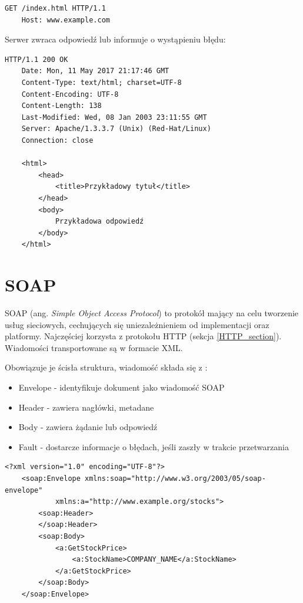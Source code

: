 \begin{lstlisting}[caption={Przykład żądania HTTP},captionpos=b]
    GET /index.html HTTP/1.1
    Host: www.example.com
\end{lstlisting}

Serwer zwraca odpowiedź lub informuje o wystąpieniu błędu:

\begin{lstlisting}[caption={Przykład odpowiedzi serwera ze statusem 200 OK},captionpos=b]
    HTTP/1.1 200 OK
    Date: Mon, 11 May 2017 21:17:46 GMT
    Content-Type: text/html; charset=UTF-8
    Content-Encoding: UTF-8
    Content-Length: 138
    Last-Modified: Wed, 08 Jan 2003 23:11:55 GMT
    Server: Apache/1.3.3.7 (Unix) (Red-Hat/Linux)
    Connection: close

    <html>
        <head>
            <title>Przykładowy tytuł</title>
        </head>
        <body>
            Przykładowa odpowiedź
        </body>
    </html>
\end{lstlisting}


\section{SOAP}

SOAP (ang. \textit{Simple Object Access Protocol}) to protokół mający na celu tworzenie usług sieciowych, cechujących się uniezależnieniem od implementacji oraz platformy. Najczęściej korzysta z protokołu HTTP (sekcja \ref{HTTP_section}). Wiadomości transportowane są w formacie XML.

Obowiązuje je ścisła struktura, wiadomość składa się z \cite{SOAP}:
\begin{itemize}
    \item Envelope - identyfikuje dokument jako wiadomość SOAP
    \item Header - zawiera nagłówki, metadane
    \item Body - zawiera żądanie lub odpowiedź
    \item Fault - dostarcze informacje o błędach, jeśli zaszły w trakcie przetwarzania
\end{itemize}

\begin{lstlisting}[caption={Przykład zapytania, które jest zgodne z protokołem SOAP},captionpos=b]
    <?xml version="1.0" encoding="UTF-8"?>
    <soap:Envelope xmlns:soap="http://www.w3.org/2003/05/soap-envelope"
            xmlns:a="http://www.example.org/stocks">
        <soap:Header>
        </soap:Header>
        <soap:Body>
            <a:GetStockPrice>
                <a:StockName>COMPANY_NAME</a:StockName>
            </a:GetStockPrice>
        </soap:Body>
    </soap:Envelope>
\end{lstlisting}


